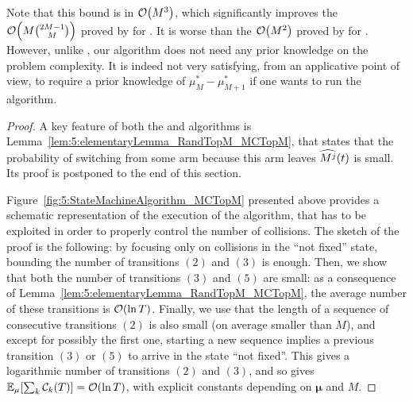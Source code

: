Note that this bound is in $\mathop{}\mathopen{}\mathcal{O}\mathopen{}\left(M^3\right)$,
which significantly improves the $\mathop{}\mathopen{}\mathcal{O}\mathopen{}\left(M{2M-1 \choose M}\right)$ proved by \cite{Anandkumar11} for \rhoRand. It is worse than the $\mathop{}\mathopen{}\mathcal{O}\mathopen{}\left(M^2\right)$ proved by \cite{Rosenski16} for \MusicalChair{}. %
However, unlike \MusicalChair, our algorithm does not need any prior knowledge on the problem complexity.
It is indeed not very satisfying, from an applicative point of view, to require a prior knowledge
of $\mu^*_{M}-\mu^*_{M+1}$ if one wants to run the \MusicalChair{} algorithm.

\begin{proof}
  A key feature of both the \RandTopM{} and \MCTopM{} algorithms is Lemma~\ref{lem:5:elementaryLemma_RandTopM_MCTopM}, that states that the probability of switching from some arm because this arm leaves $\widehat{M^j}(t)$ is small. Its proof is postponed to the end of this section.


  Figure~\ref{fig:5:StateMachineAlgorithm_MCTopM} presented above provides a schematic representation of the execution of the \MCTopM{} algorithm, that has to be exploited in order to properly control the number of collisions.
  The sketch of the proof is the following: by focusing only on collisions in the ``not fixed'' state, bounding the number of transitions $(2)$ and $(3)$ is enough.
  Then, we show that both the number of transitions $(3)$ and $(5)$ are small: as a consequence of Lemma~\ref{lem:5:elementaryLemma_RandTopM_MCTopM}, the average number of these transitions is $\mathop{}\mathopen{}\mathcal{O}\mathopen{}\left(\ln T\right)$.
  Finally, we use that the length of a sequence of consecutive transitions $(2)$ is also small (on average smaller than $M$), and except for possibly the first one, starting a new sequence implies a previous transition $(3)$ or $(5)$ to arrive in the state ``not fixed''. This gives a logarithmic number of transitions $(2)$ and $(3)$, and so gives $\mathbb{E}_{\mu}[\sum_k\mathcal{C}_k(T)] = \mathop{}\mathopen{}\mathcal{O}\mathopen{}\left(\ln T\right)$,
  with explicit constants depending on $\boldsymbol{\mu}$ and $M$.


\end{proof}
